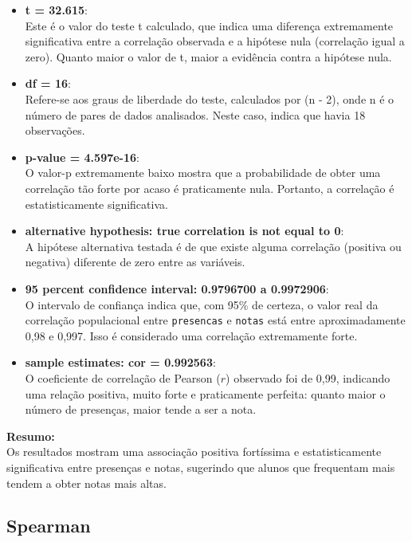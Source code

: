 \documentclass[
]{book}
\begin{document}
\begin{itemize}
\item
  \textbf{t = 32.615}:\\
  Este é o valor do teste t calculado, que indica uma diferença extremamente significativa entre a correlação observada e a hipótese nula (correlação igual a zero). Quanto maior o valor de t, maior a evidência contra a hipótese nula.
\item
  \textbf{df = 16}:\\
  Refere-se aos graus de liberdade do teste, calculados por (n - 2), onde n é o número de pares de dados analisados. Neste caso, indica que havia 18 observações.
\item
  \textbf{p-value = 4.597e-16}:\\
  O valor-p extremamente baixo mostra que a probabilidade de obter uma correlação tão forte por acaso é praticamente nula. Portanto, a correlação é estatisticamente significativa.
\item
  \textbf{alternative hypothesis: true correlation is not equal to 0}:\\
  A hipótese alternativa testada é de que existe alguma correlação (positiva ou negativa) diferente de zero entre as variáveis.
\item
  \textbf{95 percent confidence interval: 0.9796700 a 0.9972906}:\\
  O intervalo de confiança indica que, com 95\% de certeza, o valor real da correlação populacional entre \texttt{presencas} e \texttt{notas} está entre aproximadamente 0,98 e 0,997. Isso é considerado uma correlação extremamente forte.
\item
  \textbf{sample estimates: cor = 0.992563}:\\
  O coeficiente de correlação de Pearson (\(r\)) observado foi de 0,99, indicando uma relação positiva, muito forte e praticamente perfeita: quanto maior o número de presenças, maior tende a ser a nota.
\end{itemize}

\textbf{Resumo:}\\
Os resultados mostram uma associação positiva fortíssima e estatisticamente significativa entre presenças e notas, sugerindo que alunos que frequentam mais tendem a obter notas mais altas.

\subsection{Spearman}\label{spearman}
\end{document}
